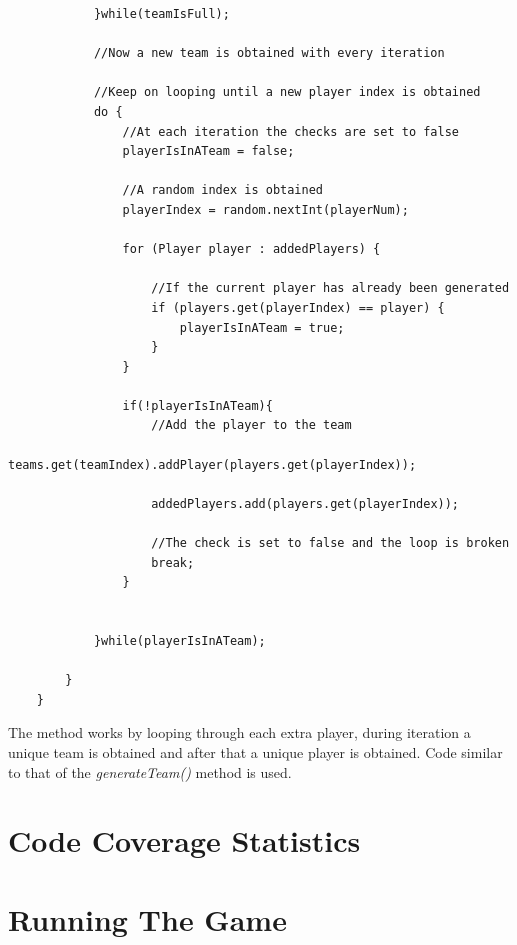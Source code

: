 \documentclass[a4paper,12pt]{extarticle}
\begin{document}
\begin{lstlisting}
            }while(teamIsFull);

            //Now a new team is obtained with every iteration

            //Keep on looping until a new player index is obtained
            do {
                //At each iteration the checks are set to false
                playerIsInATeam = false;

                //A random index is obtained
                playerIndex = random.nextInt(playerNum);

                for (Player player : addedPlayers) {

                    //If the current player has already been generated
                    if (players.get(playerIndex) == player) {
                        playerIsInATeam = true;
                    }
                }

                if(!playerIsInATeam){
                    //Add the player to the team
                    teams.get(teamIndex).addPlayer(players.get(playerIndex));

                    addedPlayers.add(players.get(playerIndex));

                    //The check is set to false and the loop is broken
                    break;
                }


            }while(playerIsInATeam);

        }
    }
\end{lstlisting}

The method works by looping through each extra player, during iteration a unique team is obtained and after that a unique player is obtained. Code similar to that of the \textit{generateTeam()} method is used.

\section{Code Coverage Statistics}

\section{Running The Game}
\end{document}

